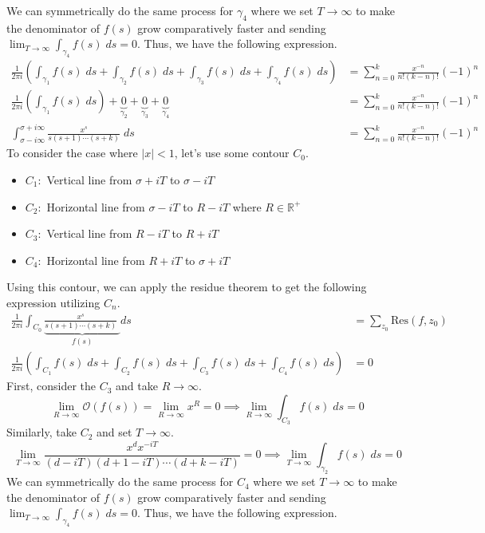 We can symmetrically do the same process for $\gamma_4$ where we set $T \rightarrow \infty$ to make the denominator of $f(s)$ grow comparatively faster and sending $\lim_{T\rightarrow\infty} \int_{\gamma_4} f(s)\;ds = 0$. Thus, we have the following expression.
\begin{align*}
    \frac{1}{2\pi i} \left(\int_{\gamma_1} f(s)\;ds + \int_{\gamma_2} f(s)\;ds + \int_{\gamma_3} f(s)\;ds + \int_{\gamma_4} f(s)\;ds \right)&= \sum_{n=0}^k \frac{x^{-n}}{n!(k-n)!} (-1)^n\\
    \frac{1}{2\pi i} \left(\int_{\gamma_1} f(s)\;ds\right) + \underbrace{0}_{\gamma_2} + \underbrace{0}_{\gamma_3} + \underbrace{0}_{\gamma_4} &= \sum_{n=0}^k \frac{x^{-n}}{n!(k-n)!} (-1)^n\\
    \int_{\sigma - i\infty}^{\sigma + i\infty} \frac{x^s}{s(s+1)\cdots(s+k)}\;ds&= \sum_{n=0}^k \frac{x^{-n}}{n!(k-n)!} (-1)^n
\end{align*}
To consider the case where $|x| < 1$, let's use some contour $C_0$.
\begin{itemize}
    \item $C_{1}:$ Vertical line from $\sigma + iT$ to $\sigma - iT$
    \item $C_{2}:$ Horizontal line from $\sigma - iT$ to $R - iT$ where $R \in \mathbb{R}^+$
    \item $C_3:$ Vertical line from $R-iT$ to $R + iT$
    \item $C_4:$ Horizontal line from $R + iT$ to $\sigma + iT$
\end{itemize}
\pagebreak
Using this contour, we can apply the residue theorem to get the following expression utilizing $C_n$.
\begin{align*}
    \frac{1}{2\pi i} \int_{C_0} \underbrace{\frac{x^s}{s(s+1)\cdots(s+k)}\;}_{f(s)}ds &= \sum_{z_0} \text{Res}(f,z_0) \\
    \frac{1}{2\pi i} \left(\int_{C_1} f(s)\;ds + \int_{C_2} f(s)\;ds + \int_{C_3} f(s)\;ds + \int_{C_4} f(s)\;ds \right)&= 0
\end{align*}
First, consider the $C_3$ and take $R \rightarrow \infty$.
$$
\lim_{R\rightarrow \infty} \mathcal{O}(f(s)) = \lim_{R\rightarrow \infty} x^{R} = 0 \implies \lim_{R\rightarrow\infty} \int_{C_{3}} f(s)\;ds = 0
$$
Similarly, take $C_2$ and set $T\rightarrow \infty$.
$$
\lim_{T\rightarrow\infty} \frac{x^{d}x^{-iT}}{(d - iT)(d + 1 - iT)\cdots(d+k - iT)} = 0 \implies \lim_{T\rightarrow \infty} \int_{\gamma_2} f(s)\;ds = 0
$$
We can symmetrically do the same process for $C_4$ where we set $T \rightarrow \infty$ to make the denominator of $f(s)$ grow comparatively faster and sending $\lim_{T\rightarrow\infty} \int_{\gamma_4} f(s)\;ds = 0$. Thus, we have the following expression.
